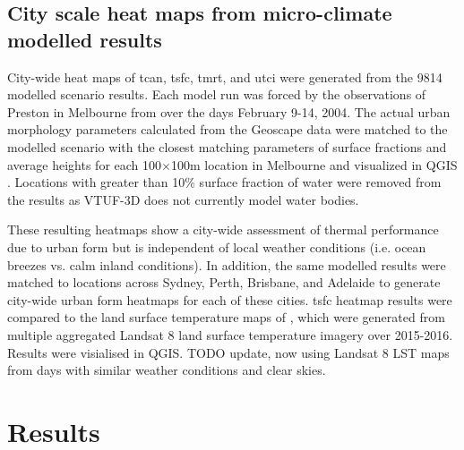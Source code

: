 \documentclass[final,3p,times,authoryear]{elsarticle}
\begin{document}
\subsection{City scale heat maps from micro-climate modelled results}\label{sec:methodsheatmaps}
%
%  

City-wide heat maps of \gls{tcan}, \gls{tsfc}, \gls{tmrt}, and \gls{utci} were generated from the 9814 modelled scenario results. Each model run was forced by the observations of Preston in Melbourne from \cite{Coutts2007} over the days February 9-14, 2004. The actual urban morphology parameters calculated from the Geoscape data were matched to the modelled scenario with the closest matching parameters of surface fractions and average heights for each 100$\times$100m location in Melbourne and visualized in QGIS \citep{QGIS2009}. Locations with greater than 10\% surface fraction of water were removed from the results as VTUF-3D does not currently model water bodies.

These resulting heatmaps show a city-wide assessment of thermal performance due to urban form but is independent of local weather conditions (i.e. ocean breezes vs. calm inland conditions). In addition, the same modelled results were matched to locations across Sydney, Perth, Brisbane, and Adelaide to generate city-wide urban form heatmaps for each of these cities.  \gls{tsfc} heatmap results were compared to the land surface temperature maps of \cite{Devereux2017}, which were generated from multiple aggregated Landsat 8 land surface temperature imagery over 2015-2016. Results were visialised in QGIS. TODO update, now using Landsat 8 LST maps from days with similar weather conditions and clear skies.

\section{Results}\label{sec:results}
\end{document}
